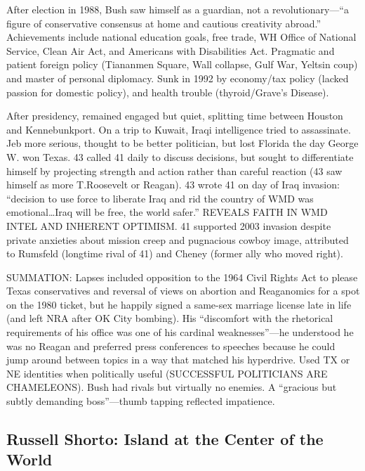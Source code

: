 \documentclass[
]{article}
\begin{document}
After election in 1988, Bush saw himself as a guardian, not a
revolutionary---``a figure of conservative consensus at home and
cautious creativity abroad.'' Achievements include national education
goals, free trade, WH Office of National Service, Clean Air Act, and
Americans with Disabilities Act. Pragmatic and patient foreign policy
(Tiananmen Square, Wall collapse, Gulf War, Yeltsin coup) and master of
personal diplomacy. Sunk in 1992 by economy/tax policy (lacked passion
for domestic policy), and health trouble (thyroid/Grave's Disease).

After presidency, remained engaged but quiet, splitting time between
Houston and Kennebunkport. On a trip to Kuwait, Iraqi intelligence tried
to assassinate. Jeb more serious, thought to be better politician, but
lost Florida the day George W. won Texas. 43 called 41 daily to discuss
decisions, but sought to differentiate himself by projecting strength
and action rather than careful reaction (43 saw himself as more
T.Roosevelt or Reagan). 43 wrote 41 on day of Iraq invasion: ``decision
to use force to liberate Iraq and rid the country of WMD was
emotional\ldots Iraq will be free, the world safer.'' REVEALS FAITH IN
WMD INTEL AND INHERENT OPTIMISM. 41 supported 2003 invasion despite
private anxieties about mission creep and pugnacious cowboy image,
attributed to Rumsfeld (longtime rival of 41) and Cheney (former ally
who moved right).

SUMMATION: Lapses included opposition to the 1964 Civil Rights Act to
please Texas conservatives and reversal of views on abortion and
Reaganomics for a spot on the 1980 ticket, but he happily signed a
same-sex marriage license late in life (and left NRA after OK City
bombing). His ``discomfort with the rhetorical requirements of his
office was one of his cardinal weaknesses''---he understood he was no
Reagan and preferred press conferences to speeches because he could jump
around between topics in a way that matched his hyperdrive. Used TX or
NE identities when politically useful (SUCCESSFUL POLITICIANS ARE
CHAMELEONS). Bush had rivals but virtually no enemies. A ``gracious but
subtly demanding boss''---thumb tapping reflected impatience.

\hypertarget{russell-shorto-island-at-the-center-of-the-world}{%
\subsection{Russell Shorto: Island at the Center of the
World}\label{russell-shorto-island-at-the-center-of-the-world}}
\end{document}
